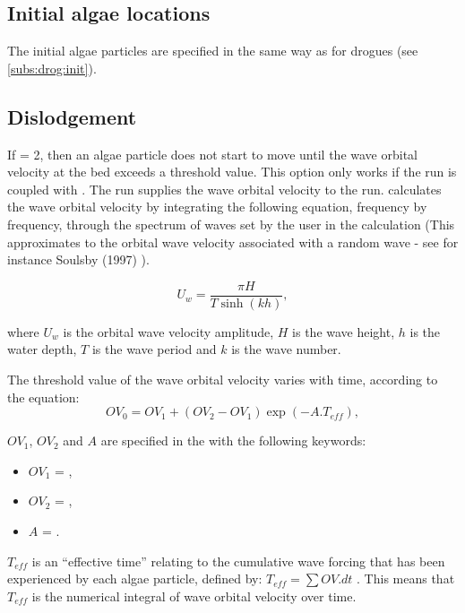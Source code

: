 \subsection{Initial algae locations}

The initial algae particles are specified in the same way as for drogues
(see \ref{subs:drog:init}). 

\subsection{Dislodgement}
\label{subs:alg:disl}

If  = 2, then an algae particle does not
start to move until the wave orbital velocity at the bed exceeds a threshold value.
This option only works if the  run is coupled with \tomawac.
The \tomawac run supplies the wave orbital velocity to the  run.
\tomawac calculates the wave orbital velocity by integrating the following
equation, frequency by frequency, through the spectrum of waves set by the user
in the \tomawac calculation
(This approximates to the orbital wave velocity associated with a random wave
- see for instance Soulsby (1997) \cite{Soulsby1997}).

\begin{equation}
U_w=\dfrac{{\pi}H}{T\sinh(kh)},
\end{equation}

where $U_w$ is the orbital wave velocity amplitude, $H$ is the wave height,
$h$ is the water depth, $T$ is the wave period and $k$ is the wave number.

The threshold value of the wave orbital velocity varies with time,
according to the equation:
\begin{equation}
OV_0 = OV_1 + (OV_2 - OV_1) \exp(-A . T_{eff}),
\end{equation}

$OV_1$, $OV_2$ and $A$ are specified in the 
with the following keywords:

\begin{itemize}
\item $OV_1$ = ,
\item $OV_2$ = ,
\item $A$ = .
\end{itemize}

$T_{eff}$ is an “effective time” relating to the cumulative wave forcing that
has been experienced by each algae particle, defined by:
$T_{eff} = \sum { OV . dt}$ .
This means that $T_{eff}$ is the numerical integral of wave orbital velocity
over time.


